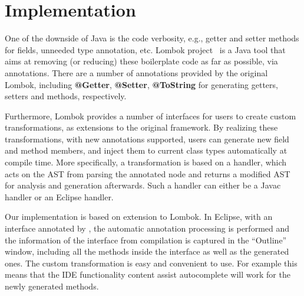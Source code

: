 \section{Implementation}
\begin{comment}
Haoyuan

discuss implementation in lombok; and limitations.

\bruno{The implementation does not support separate compilation yet. Can we fix this?}

\haoyuan{http://notatube.blogspot.hk/2010/12/project-lombok-creating-custom.html}

\haoyuan{https://blog.frankel.ch/lombok-reduces-your-boilerplate-code}

\haoyuan{https://projectlombok.org/}
\end{comment}

One of the downside of Java is the code verbosity, e.g., getter and setter
methods for fields, unneeded type annotation, etc. Lombok project~\cite{} is a
Java tool that aims at removing (or reducing) these boilerplate code as far as
possible, via annotations. There are a number of annotations provided by the
original Lombok, including \textbf{@Getter}, \textbf{@Setter},
\textbf{@ToString} for generating getters, setters and  methods,
respectively.

Furthermore, Lombok provides a number of interfaces for users to create custom
transformations, as extensions to the original framework. By realizing these
transformations, with new annotations supported, users can generate new field
and method members, and inject them to current class types automatically at
compile time. More specifically, a transformation is based on a handler, which
acts on the AST from parsing the annotated node and returns a modified AST for
analysis and generation afterwards. Such a handler can either be a Javac handler
or an Eclipse handler.

Our implementation is based on extension to Lombok. In Eclipse, with an
interface annotated by \mixin, the automatic annotation processing is performed
and the information of the interface from compilation is captured in the
``Outline'' window, including all the methods inside the interface as well as
the generated ones.
 The custom transformation is easy and convenient to use.
 For example this means that the IDE functionality 
 content assist autocomplete will work for the newly generated methods.


